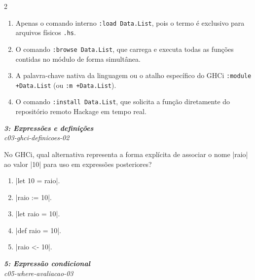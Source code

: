\documentclass[a4paper,10pt,brazil]{article}
\begin{document}
\begin{multicols}{2}
\begin{enumerate}
  \item Apenas o comando interno \texttt{:load Data.List}, pois o termo  é exclusivo para arquivos físicos \texttt{.hs}.

  \item O comando \texttt{:browse Data.List}, que carrega e executa todas as funções contidas no módulo de forma simultânea.

  \item A palavra-chave nativa da linguagem  ou o atalho específico do GHCi \texttt{:module +Data.List} (ou \texttt{:m +Data.List}).

  \item O comando \texttt{:install Data.List}, que solicita a função diretamente do repositório remoto Hackage em tempo real.


\end{enumerate}

\begin{flushright}
  \footnotesize
  \textit{\textbf{3: Expressões e definições}}\\
  \textit{c03-ghci-definicoes-02}\\

\end{flushright}
No GHCi, qual alternativa representa a forma explícita de associar o nome \haskellinline|raio| ao valor \haskellinline|10| para uso em expressões posteriores?

\begin{enumerate}
  \item \haskellinline|let 10 = raio|.

  \item \haskellinline|raio := 10|.

  \item \haskellinline|let raio = 10|.

  \item \haskellinline|def raio = 10|.

  \item \haskellinline|raio <- 10|.


\end{enumerate}

\begin{flushright}
  \footnotesize
  \textit{\textbf{5: Expressão condicional}}\\
  \textit{c05-where-avaliacao-03}\\


\end{flushright}
\end{multicols}
\end{document}
